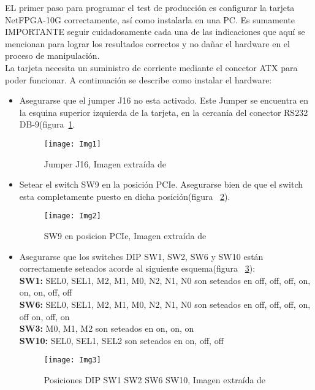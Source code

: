 EL primer paso para programar el test de producción es configurar la tarjeta NetFPGA-10G correctamente, así como instalarla en una PC. Es sumamente IMPORTANTE seguir cuidadosamente cada una de las indicaciones que aquí se mencionan para lograr los resultados correctos y no dañar el hardware en el proceso de manipulación.\\ 

La tarjeta necesita un suministro de corriente mediante el conector ATX para poder funcionar. A continuación se describe como instalar el hardware:

\begin{itemize}
\item Asegurarse que el jumper J16 no esta activado. Este Jumper se encuentra en la esquina superior izquierda de la tarjeta, en la cercanía del conector RS232 DB-9(figura~\ref{fig:Img1}.

\begin{figure}[htbp!] 
\centering    
\texttt{[image: Img1]}
\caption[Jumper J16]{Jumper J16, Imagen extra\'ida de \citep{NetFPGA6}}
\label{fig:Img1}
\end{figure}

\item Setear el switch SW9 en la posición PCIe. Asegurarse bien de que el switch esta completamente puesto en dicha posición(figura ~\ref{fig:Img2}).

\begin{figure}[htbp!] 
\centering    
\texttt{[image: Img2]}
\caption[SW9 en posicion PCIe]{SW9 en posicion PCIe, Imagen extra\'ida de \citep{NetFPGA6}}
\label{fig:Img2}
\end{figure}

\item Asegurarse que los switches DIP SW1, SW2, SW6 y SW10 están correctamente seteados acorde al siguiente esquema(figura ~\ref{fig:Img3}):\\

\textbf{SW1:} SEL0, SEL1, M2, M1, M0, N2, N1, N0 son seteados en off, off, off, on, on, on, off, off\\
\textbf{SW6:} SEL0, SEL1, M2, M1, M0, N2, N1, N0 son seteados en off, off, off, on, off on, off, on\\
\textbf{SW3:} M0, M1, M2 son seteados en on, on, on\\
\textbf{SW10:} SEL0, SEL1, SEL2 son seteados en on, off, off\\

\begin{figure}[htbp!] 
\centering    
\texttt{[image: Img3]}
\caption[Posiciones DIP SW1 SW2 SW6 SW10]{Posiciones DIP SW1 SW2 SW6 SW10, Imagen extra\'ida de \citep{NetFPGA6}}
\label{fig:Img3}
\end{figure}


\end{itemize}
